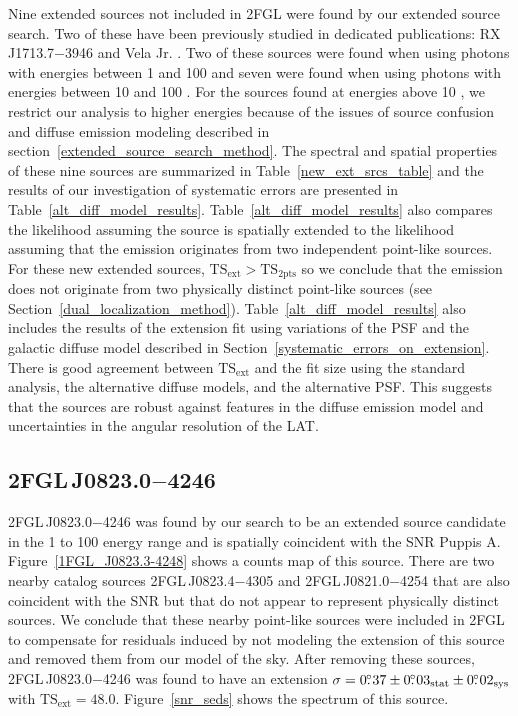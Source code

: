 \documentclass[12pt,preprint]{aastex}
\newcommand{\gev}{\text{GeV}\xspace}
\newcommand{\tsext}{{\ensuremath{\text{TS}_{\text{ext}}}}\xspace}
\newcommand{\tsinc}{\ensuremath{\text{TS}_{\text{2pts}}}\xspace}
\newcommand{\sys}{\text{sys}\xspace}
\newcommand{\stat}{\text{stat}\xspace}
\begin{document}
Nine extended sources not included in 2FGL were found by our
extended source search. Two of these have been previously
studied in dedicated publications: RX\,J1713.7$-$3946 and Vela
Jr. \citep{rx_j1713_lat,vela_jr_lat}.
Two of these sources were
found when using photons with energies between 1 \gev and 100 \gev and seven
were found when using photons with energies between 10 \gev and 100 \gev.
For the sources found at energies above 10 \gev, we restrict our
analysis to higher energies because of the issues
of source confusion and diffuse emission modeling described in
section~\ref{extended_source_search_method}.
The spectral and spatial properties of these nine sources are summarized
in Table~\ref{new_ext_srcs_table} and the results of our investigation of
systematic errors are presented in Table~\ref{alt_diff_model_results}.
Table~\ref{alt_diff_model_results}
also
compares the likelihood assuming the source is spatially
extended to the likelihood assuming 
that the emission originates from two independent point-like
sources. For these new extended sources, $\tsext>\tsinc$ 
so we conclude that 
the \gev emission does not originate from two physically
distinct point-like sources (see Section~\ref{dual_localization_method}).  
Table~\ref{alt_diff_model_results} also includes the
results of the extension fit using variations of the PSF and the galactic
diffuse model described in Section~\ref{systematic_errors_on_extension}.
There is good agreement between \tsext and the fit size using the standard
analysis, the alternative diffuse models, and the alternative PSF.
This suggests that the sources are robust against features in the diffuse
emission model and uncertainties in the angular resolution of the LAT.

\subsection{2FGL\,J0823.0$-$4246}
\label{section_2FGL_J0823.0-4246}


2FGL\,J0823.0$-$4246 was found by our search to be an extended source
candidate in the 1 \gev to 100 \gev energy range and is spatially
coincident with the SNR Puppis A.  Figure~\ref{1FGL_J0823.3-4248} shows
a counts map of this source. There are two nearby catalog sources 2FGL\,J0823.4$-$4305
and 2FGL\,J0821.0$-$4254 that are also coincident with the SNR but that
do not appear to represent physically distinct sources.
We conclude that
these nearby point-like sources
were included in 2FGL to compensate for residuals induced
by not modeling the extension of this source and
removed them from our model of the sky.
After removing these sources, 2FGL\,J0823.0$-$4246 was found to have an extension 
$\sigma=0\fdg37\pm0\fdg03_\stat\pm0\fdg02_\sys$ with 
$\tsext=48.0$.  Figure~\ref{snr_seds} shows the spectrum of
this source.
\end{document}
